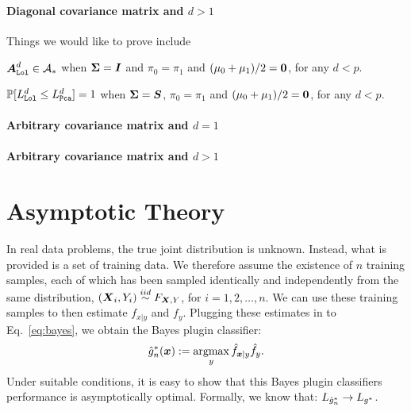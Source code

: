 \documentclass[10pt]{article}
\begin{document}
\paragraph{Diagonal covariance matrix and $d>1$}

Things we would like to prove include

\begin{lem}
$\boldsymbol{A}_{{\sc \texttt{Lol}}}^d \in \mathcal{A}_*$ when $\boldsymbol{\Sigma}=\boldsymbol{I}$ and $\pi_0=\pi_1$ and $(\mu_0+\mu_1)/2=\boldsymbol{0}$, for any $d < p$.
\end{lem}

\begin{lem}
$\mathbb{P}[L_{{\sc \texttt{Lol}}}^d \leq L_{{\sc \texttt{Pca}}}^d]=1$ when $\boldsymbol{\Sigma}=\boldsymbol{S}$, $\pi_0=\pi_1$ and $(\mu_0+\mu_1)/2=\boldsymbol{0}$, for any $d < p$.
\end{lem}


\paragraph{Arbitrary covariance matrix and $d=1$}



\paragraph{Arbitrary covariance matrix and $d>1$}







\section{Asymptotic Theory}

In real data problems,  the true joint distribution is unknown. Instead, what is provided is a set of training data.  We therefore assume the existence of $n$ training samples, each of which has been sampled identically and independently from the same distribution, $(\boldsymbol{X}_i,Y_i) \overset{iid}{\sim} F_{\boldsymbol{X},Y}$, for $i =1,2,\ldots, n$.  We can use these training samples to then estimate $f_{x|y}$ and $f_y$.  Plugging these estimates in to Eq.~\eqref{eq:bayes}, we obtain the Bayes plugin classifier:
\begin{align} \label{eq:plugin}
\mh{g}^*_n(\bx) := \argmax_y \mh{f}_{\bx|y}\mh{f}_y.
\end{align}
Under suitable conditions, it is easy to show that this Bayes plugin classifiers performance is asymptotically optimal.  
Formally, we know that:
$L_{\hat{g}^*_n} \rightarrow L_{g^*}$.
\end{document}
